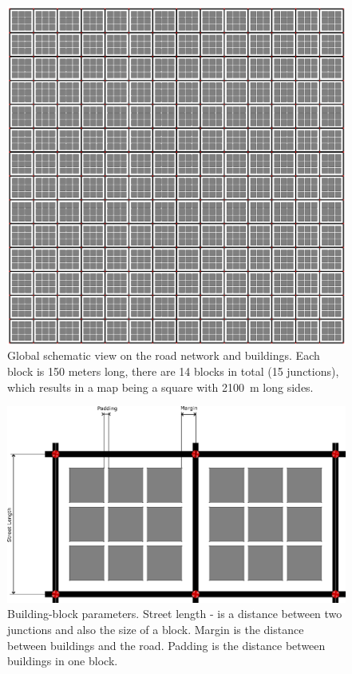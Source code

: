 \documentclass[]{nsm-thesis}
\begin{document}
\begin{figure}
	\centering
	\includegraphics[width=1\textwidth]{figures/ManhattanGrid.png}
	\caption{Global schematic view on the road network and buildings. Each block is 150 meters long, there are 14 blocks in total (15 junctions), which results in a map being a square with \SI{2100}{\meter} long sides.}
	\label{fig:manhattangrid}
\end{figure}


\begin{figure}
	\centering
	\includegraphics[width=1\textwidth]{figures/ManhattanGridBlock-commented.png}
	\caption{Building-block parameters. Street length - is a distance between two junctions and also the size of a block. Margin is the distance between buildings and the road. Padding is the distance between buildings in one block.}
	\label{fig:manhattangridblock}
\end{figure}
\end{document}
